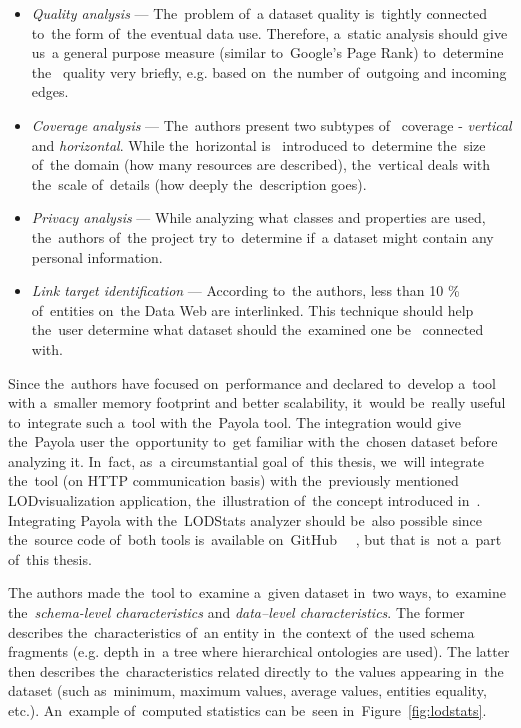 \begin{itemize}
  \item \emph{Quality analysis} --- The~problem of~a dataset quality is~tightly connected 
  to~the form of~the eventual data use. Therefore, a~static analysis should 
  give us~a general purpose measure (similar to~Google's Page Rank) to~determine the~  quality very briefly, e.g. based on~the number of~outgoing and incoming 
  edges.
  
  \item \emph{Coverage analysis} --- The~authors present two subtypes of~  coverage - \emph{vertical} and \emph{horizontal}.  While the~horizontal is~  introduced to~determine the~size of~the domain (how many resources are described),
  the~vertical deals with the~scale of~details (how deeply the~description goes).
  
  \item \emph{Privacy analysis} --- While analyzing what classes and properties 
  are used, the~authors of~the project try to~determine if~a dataset 
  might contain any personal information.
  
  \item \emph{Link target identification} --- According to~the authors, less than 
  10 \% of~entities on~the Data Web are interlinked. This technique 
  should help the~user determine what dataset should the~examined one be~  connected with.
\end{itemize}

Since the~authors have focused on~performance and declared to~develop a~tool with a~smaller memory footprint and better scalability, it~would be~really useful to~integrate such a~tool with the~Payola tool.
The integration would give the~Payola user the~opportunity to~get familiar with the~chosen dataset before analyzing it. In~fact, as~a circumstantial goal of~this 
thesis, we~will integrate the~tool (on HTTP communication basis) with the~previously mentioned 
LODvisualization application, the~illustration of~the concept introduced 
in~\cite{ldvm}. Integrating Payola with the~LODStats analyzer should be~also 
possible since the~source code of~both tools is~available on~GitHub~\cite{github-payola} 
~\cite{github-lodstats}, but that is~not a~part of~this thesis.

The authors made the~tool to~examine a~given dataset in~two ways, to~examine 
the~\emph{schema-level characteristics} and \emph{data--level characteristics}. 
The former describes the~characteristics of~an entity in~the context of~the used 
schema fragments (e.g. depth in~a tree where hierarchical ontologies are used). 
The latter then describes the~characteristics related directly to~the values 
appearing in~the dataset (such as~minimum, maximum values, average values, entities equality, 
etc.). An~example of~computed statistics can be~seen in~Figure~\ref{fig:lodstats}.

